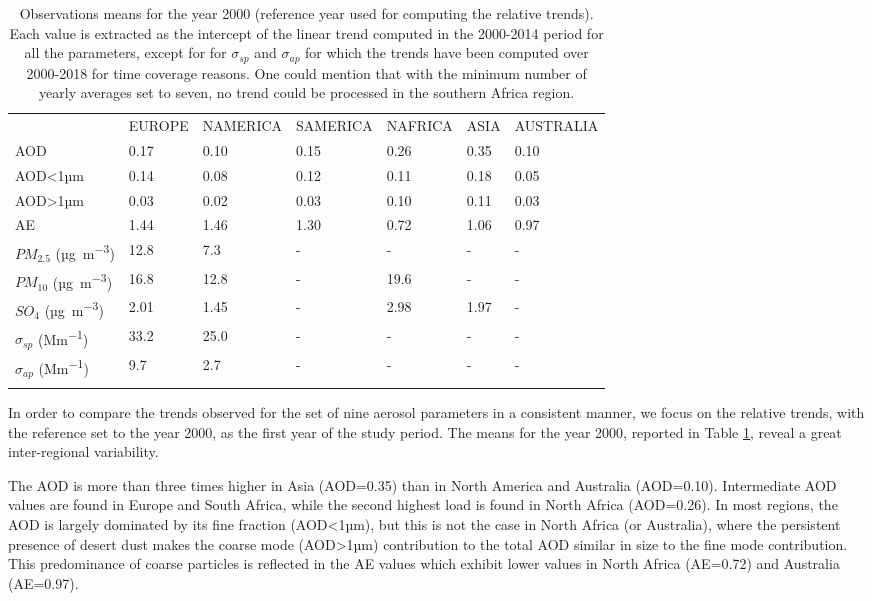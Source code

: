 \documentclass[journal abbreviation, manuscript]{copernicus}
\begin{document}
\begin{table}
 \begin{tabular}{lllllll}
  \tophline
                     & EUROPE & NAMERICA & SAMERICA & NAFRICA & ASIA & AUSTRALIA \\
  \middlehline
  AOD                & 0.17   & 0.10     & 0.15     & 0.26    & 0.35 & 0.10      \\
  AOD<1µm            & 0.14   & 0.08     & 0.12     & 0.11    & 0.18 & 0.05      \\
  AOD>1µm            & 0.03   & 0.02     & 0.03     & 0.10    & 0.11 & 0.03      \\
  AE                 & 1.44   & 1.46     & 1.30     & 0.72    & 1.06 & 0.97      \\
  $PM_{2.5}$ (\unit{µg.m^{-3}})     & 12.8   & 7.3      & -        & -       & -    & -         \\
  $PM_{10}$ (\unit{µg.m^{-3}})      & 16.8   & 12.8     & -        & 19.6    & -    & -         \\
  $SO_{4}$ (\unit{µg.m^{-3}})       & 2.01   & 1.45     & -        & 2.98    & 1.97 & -         \\
  $\sigma_{sp}$ (\unit{Mm^{-1}}) & 33.2   & 25.0     & -        & -       & -    & -         \\
  $\sigma_{ap}$ (\unit{Mm^{-1}})  & 9.7    & 2.7      & -        & -       & -    & -         \\
  \bottomhline
 \end{tabular}

 \caption{Observations means for the year 2000 (reference year used for computing the relative trends). Each value is extracted as the intercept of the linear trend computed in the 2000-2014 period for all the parameters, except for for $\sigma_{sp}$ and $\sigma_{ap}$ for which the trends have been computed over 2000-2018 for time coverage reasons. One could mention that with the minimum number of yearly averages set to seven, no trend could be processed in the southern Africa region.}
 \label{table:obs_2000mean}
\end{table}

In order to compare the trends observed for the set of nine aerosol parameters in a consistent manner, we focus on the relative trends, with the reference set to the year 2000, as the first year of the study period. The means for the year 2000, reported in Table \ref{table:obs_2000mean}, reveal a great inter-regional variability.

The AOD is more than three times higher in Asia (AOD=0.35) than in North America and Australia (AOD=0.10). Intermediate AOD values are found in Europe and South Africa, while the second highest load is found in North Africa (AOD=0.26). In most regions, the AOD is largely dominated by its fine fraction (AOD<1µm), but this is not the case in North Africa (or Australia), where the persistent presence of desert dust makes the coarse mode (AOD>1µm) contribution to the total AOD similar in size to the fine mode contribution. This predominance of coarse particles is reflected in the AE values which exhibit lower values in North Africa (AE=0.72) and Australia (AE=0.97).
\end{document}
